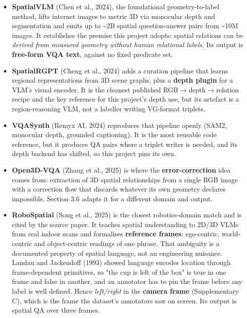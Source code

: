 \begin{itemize}
\item \textbf{SpatialVLM} (Chen et al., 2024), the foundational geometry-to-label method, lifts internet images to metric 3D via monocular depth and segmentation and emits up to \textasciitilde{}2B spatial question-answer pairs from \textasciitilde{}10M images. It establishes the premise this project adopts: spatial relations can be \textit{derived from measured geometry without human relational labels}. Its output is \textbf{free-form VQA text}, against no fixed predicate set.
\item \textbf{SpatialRGPT} (Cheng et al., 2024) adds a curation pipeline that learns regional representations from 3D scene graphs, plus a \textbf{depth plugin} for a VLM's visual encoder. It is the cleanest published RGB$\rightarrow$depth$\rightarrow$relation recipe and the key reference for this project's depth use, but its artefact is a region-reasoning VLM, not a labeller writing VG-format triplets.
\item \textbf{VQASynth} (Remyx AI, 2024) reproduces that pipeline openly (SAM2, monocular depth, grounded captioning). It is the most reusable code reference, but it produces QA pairs where a triplet writer is needed, and its depth backend has shifted, so this project pins its own.
\item \textbf{Open3D-VQA} (Zhang et al., 2025) is where the \textbf{error-correction} idea comes from: extraction of 3D spatial relationships from a single RGB image with a correction flow that discards whatever its own geometry declares impossible. Section 3.6 adapts it for a different domain and output.
\item \textbf{RoboSpatial} (Song et al., 2025) is the closest robotics-domain match and is cited by the source paper. It teaches spatial understanding to 2D/3D VLMs from real indoor scans and formalises \textbf{reference frames}: ego-centric, world-centric and object-centric readings of one phrase. That ambiguity is a documented property of spatial language, not an engineering nuisance. Landau and Jackendoff (1993) showed language encodes location through frame-dependent primitives, so "the cup is left of the box" is true in one frame and false in another, and an annotator has to pin the frame before any label is well defined. Hence \textit{left/right} in the \textbf{camera frame} (Supplementary C), which is the frame the dataset's annotators saw on screen. Its output is spatial QA over three frames.
\end{itemize}

